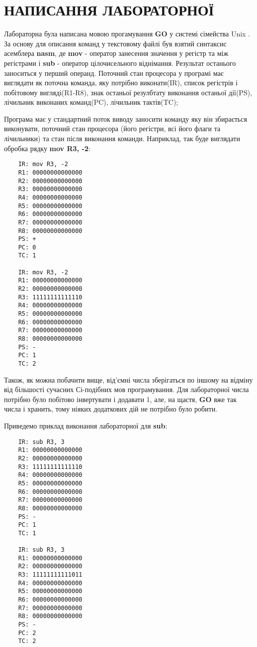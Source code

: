 \documentclass[a4paper,12pt]{report}
\begin{document}
\section{НАПИСАННЯ ЛАБОРАТОРНОЇ}
Лабораторна була написана мовою прогамування \textbf{GO} у системі сімейства Unix
. За основу для описання команд у текстовому файлі був взятий синтаксис асемблера
\textbf{nasm}, де \textbf{mov} - оператор занесення значення у регістр та між регістрами
і \textbf{sub} - оператор цілочисельного віднімання. Результат останього заноситься у перший операнд.
Поточний стан процесора у програмі має виглядати як поточна команда,
яку потрібно виконати(IR), список регістрів і побітовому вигляді(R1-R8),
знак останьої резулбтату виконання останьої дії(PS), лічильник виконаних
команд(PC), лічильник тактів(TC);

Програма має у стандартний поток виводу заносити команду яку він збирається
виконувати, поточний стан процесора (його регістри, всі його флаги та лічильники)
та стан після виконання команди. Наприклад, так буде виглядати обробка рядку
\textbf{mov R3, -2}:
\begin{verbatim}
    IR: mov R3, -2
    R1: 00000000000000
    R2: 00000000000000
    R3: 00000000000000
    R4: 00000000000000
    R5: 00000000000000
    R6: 00000000000000
    R7: 00000000000000
    R8: 00000000000000
    PS: +
    PC: 0
    TC: 1

    IR: mov R3, -2
    R1: 00000000000000
    R2: 00000000000000
    R3: 11111111111110
    R4: 00000000000000
    R5: 00000000000000
    R6: 00000000000000
    R7: 00000000000000
    R8: 00000000000000
    PS: -
    PC: 1
    TC: 2
\end{verbatim}
Також, як можна побачити вище, від'ємні числа зберігаться по іншому
на відміну від більшості сучасних Сі-подібних мов програмування.
Для лабораторної числа потрібно було побітово інвертувати і додавати 1,
але, на щастя, \textbf{GO} вже так числа і хранить, тому ніяких додаткових
дій не потрібно було робити.

Приведемо приклад виконання лабораторної для \textbf{sub}:
\begin{verbatim}
    IR: sub R3, 3
    R1: 00000000000000
    R2: 00000000000000
    R3: 11111111111110
    R4: 00000000000000
    R5: 00000000000000
    R6: 00000000000000
    R7: 00000000000000
    R8: 00000000000000
    PS: -
    PC: 1
    TC: 1

    IR: sub R3, 3
    R1: 00000000000000
    R2: 00000000000000
    R3: 11111111111011
    R4: 00000000000000
    R5: 00000000000000
    R6: 00000000000000
    R7: 00000000000000
    R8: 00000000000000
    PS: -
    PC: 2
    TC: 2   
\end{verbatim}
\clearpage
\end{document}
